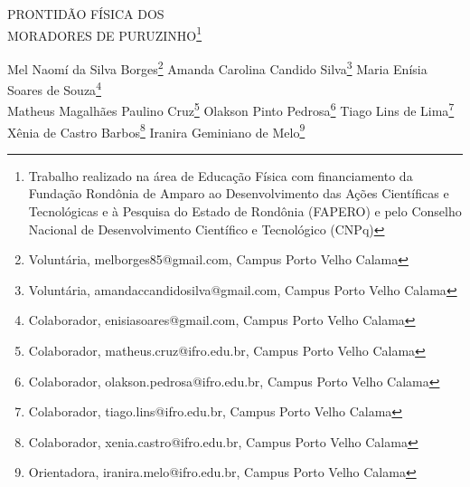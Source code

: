 \documentclass[article,12pt,onesidea,4paper,english,brazil]{abntex2}
\begin{document}
	
	
	\frenchspacing 
	
	\begin{center}
		\LARGE PRONTIDÃO FÍSICA DOS\\MORADORES DE PURUZINHO\footnote{Trabalho realizado na área de Educação Física com financiamento da Fundação Rondônia de Amparo ao
			Desenvolvimento das Ações Científicas e Tecnológicas e à Pesquisa do Estado de Rondônia (FAPERO) e pelo
			Conselho Nacional de Desenvolvimento Científico e Tecnológico (CNPq)}
		
		\normalsize
		Mel Naomí da Silva Borges\footnote{Voluntária, melborges85@gmail.com, Campus Porto Velho Calama} 
		Amanda Carolina Candido Silva\footnote{Voluntária, amandaccandidosilva@gmail.com, Campus Porto Velho Calama} 
		Maria Enísia Soares de Souza\footnote{Colaborador, enisiasoares@gmail.com, Campus Porto Velho Calama} \\
		Matheus Magalhães Paulino Cruz\footnote{Colaborador, matheus.cruz@ifro.edu.br, Campus Porto Velho Calama}
		Olakson Pinto Pedrosa\footnote{Colaborador, olakson.pedrosa@ifro.edu.br, Campus Porto Velho Calama}
		Tiago Lins de Lima\footnote{Colaborador, tiago.lins@ifro.edu.br, Campus Porto Velho Calama}\\
		Xênia de Castro Barbos\footnote{Colaborador, xenia.castro@ifro.edu.br, Campus Porto Velho Calama}
        Iranira Geminiano de Melo\footnote{Orientadora, iranira.melo@ifro.edu.br, Campus Porto Velho Calama}		
		 
	\end{center}
	
\end{document}
